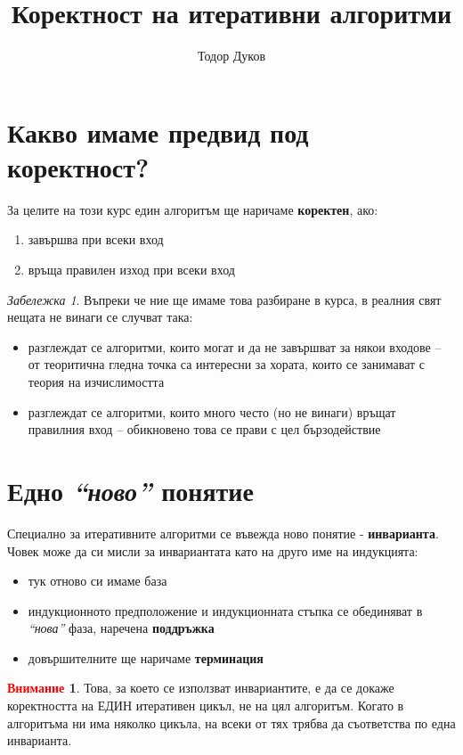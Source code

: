 \documentclass{article}
\title{Коректност на итеративни алгоритми}
\author{Тодор Дуков}
\date{}
\theoremstyle{definition}
\newtheorem*{warning}{\textcolor{red}{Внимание}}
\theoremstyle{plain}
\theoremstyle{remark}
\newtheorem*{remark}{Забележка}
\theoremstyle{definition}
\begin{document}
\maketitle

\section*{Какво имаме предвид под коректност?}

За целите на този курс един алгоритъм ще наричаме \textbf{коректен}, ако:
\begin{enumerate}
    \item завършва при всеки вход
    \item връща правилен изход при всеки вход
\end{enumerate}

\begin{remark}
    Въпреки че ние ще имаме това разбиране в курса, в реалния свят нещата не винаги се случват така:
    \begin{itemize}
        \item разглеждат се алгоритми, които могат и да не завършват за някои входове -- от теоритична гледна точка са интересни за хората, които се занимават с теория на изчислимостта
        \item разглеждат се алгоритми, които много често (но не винаги) връщат правилния вход -- обикновено това се прави с цел бързодействие
    \end{itemize}
\end{remark}

\section*{Едно \textit{``ново''} понятие}

Специално за итеративните алгоритми се въвежда ново понятие - \textbf{инварианта}.
Човек може да си мисли за инвариантата като на друго име на индукцията:
\begin{itemize}
    \item тук отново си имаме база
    \item индукционното предположение и индукционната стъпка се обединяват в \textit{``нова''} фаза, наречена \textbf{поддръжка}
    \item довършителните ще наричаме \textbf{терминация}
\end{itemize}

\begin{warning}
    Това, за което се използват инвариантите, е да се докаже коректността на ЕДИН итеративен цикъл, не на цял алгоритъм.
    Когато в алгоритъма ни има няколко цикъла, на всеки от тях трябва да съответства по една инварианта.
\end{warning}
\end{document}

